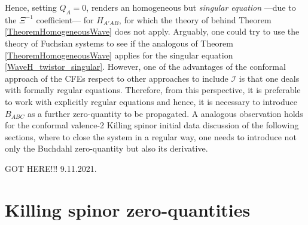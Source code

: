 \documentclass[10pt,a4paper]{article}
\theoremstyle{plain}
\begin{document}
{%
Hence, setting $Q_{A}=0$, renders an homogeneous but
\emph{singular equation} ---due to the $\Xi^{-1}$ coefficient---
for $H_{A'AB}$, for which the theory of behind Theorem
\ref{TheoremHomogeneousWave} does not apply. Arguably, one could try
to use the theory of Fuchsian systems to see if the analogous of
Theorem \ref{TheoremHomogeneousWave} applies for the singular equation
\eqref{WaveH_twistor_singular}.  However, one of the advantages of the
conformal approach of the CFEs respect to other approaches to include
$\mathscr{I}$ is that one deals with formally regular equations.
Therefore, from this perspective,
it is preferable to work with explicitly regular equations and hence,
it is necessary to introduce $B_{ABC}$ as a further zero-quantity to
be propagated.  A analogous observation holds for the conformal valence-2
Killing spinor initial data discussion of the following sections,
where to close the system in a regular way, one needs to introduce not
only the Buchdahl zero-quantity but also its derivative.








}


GOT HERE!!! 9.11.2021.

  


\section{Killing spinor zero-quantities}
\label{Sec:KillinSpinorZeroQuantities}
\end{document}
